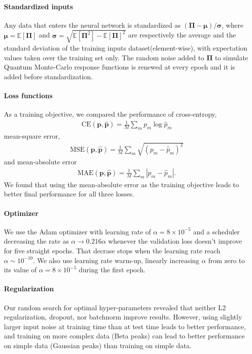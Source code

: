 \documentclass[notitlepage,11pt,nofootinbib]{revtex4-1}
\renewcommand{\vec}[1]{\bm{#1}}
\begin{document}
\paragraph*{Standardized inputs} Any data that enters the neural network is standardized as $(\vec \Pi - \vec\mu)/\vec\sigma$, where $\vec \mu = \mathbb{E}[\vec \Pi]$ and $\vec \sigma = \sqrt{\mathbb{E}[\vec \Pi^2] - \mathbb{E}[\vec \Pi]^2}$ are respectively the average and the standard deviation of the training inputs dataset(element-wise), with expectation values taken over the training set only. The random noise added to $\vec \Pi$ to simulate Quantum Monte-Carlo response functions is renewed at every epoch and it is added before standardization.

\paragraph*{Loss functions} As a training objective, we compared the performance of cross-entropy, 
\begin{align}
    \text{CE}(\vec p,\hat{\vec p}) = \frac{1}{M}\sum_m p_m \log \hat{p}_m
\end{align}
mean-square error, 
\begin{align}
    \text{MSE}(\vec p,\hat{\vec p}) = \frac{1}{M}\sum_m \sqrt{(p_m - \hat{p}_m)^2}
\end{align}
and mean-absolute error
\begin{align}
    \text{MAE}(\vec p,\hat{\vec p}) = \frac{1}{M}\sum_m |p_m - \hat{p}_m|.
\end{align}
We found that using the mean-absolute error as the training objective leads to better final performance for all three losses.

\paragraph*{Optimizer} We use the Adam optimizer with learning rate of $\alpha = 8\times10^{-5}$ and a scheduler decreasing the rate as $\alpha \rightarrow 0.216\alpha$ whenever the validation loss doesn't improve for five straight epochs. That decrase stops when the learning rate reach $\alpha\sim10^{-10}$. We also use learning rate warm-up, linearly increasing $\alpha$ from zero to its value of $\alpha = 8\times10^{-5}$ during the first epoch.

\paragraph*{Regularization} Our random search for optimal hyper-parameters revealed that neither L2 regularization, dropout, nor batchnorm improve results. However, using slightly larger input noise at training time than at test time leads to better performance, and training on more complex data (Beta peaks) can lead to better performance on simple data (Gaussian peaks) than training on simple data.
\end{document}
